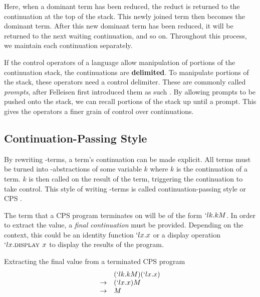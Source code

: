   Here, when a dominant term has been reduced, 
  the reduct is returned to the continuation at the top of the stack. 
  This newly joined term then becomes the dominant term. 
  After this new dominant term has been reduced, 
  it will be returned to the next waiting continuation, and so on. 
  Throughout this process, we maintain each continuation separately.

  If the control operators of a language allow manipulation of portions of the continuation stack,
  the continuations are \textbf{delimited}.
  To manipulate portions of the stack, these operators need a control delimiter.
  These are commonly called \emph{prompts}, after Felleisen first introduced them as such \cite{Felleisen88}.
  By allowing prompts to be pushed onto the stack, we can recall portions of the stack up until a prompt.
  This gives the operators a finer grain of control over continuations.

  \subsection{Continuation-Passing Style}
 
  By rewriting \lam-terms, a term's continuation can be made explicit. 
  All terms must be turned into \lam-abstractions of some variable $k$ where $k$ is the continuation of a term. 
  $k$ is then called on the result of the term, triggering the continuation to take control.
  This style of writing \lam-terms is called continuation-passing style or CPS \cite{Sussman98}.
  
  
  The term that a CPS program terminates on will be of the form
  $`lk.kM$. In order to extract the value, a \emph{final continuation}
  must be provided. Depending on the context, this could be an identity 
  function $`lx.x$ or a display operation $`lx.\textsc{display }x$ to
  display the results of the program.

  \begin{example}{Extracting the final value from a terminated CPS program}
  \[
  \begin{array}{ll}
                & (`lk.kM)(`lx.x) \\
    \rightarrow & (`lx.x)M \\
    \rightarrow & M
  \end{array}
  \]
  \end{example}
 
